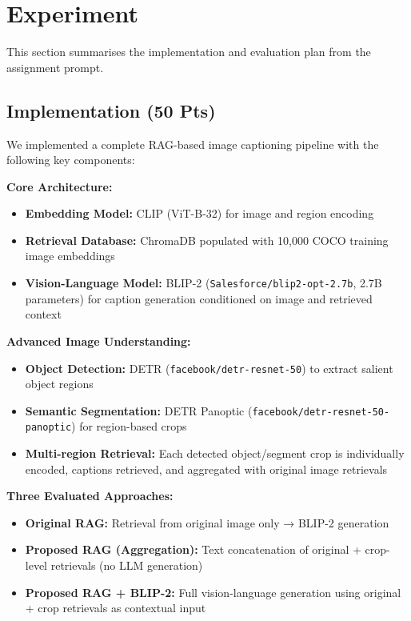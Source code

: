 \documentclass[11pt]{article}
\begin{document}
\section{Experiment}
\label{sec:experiment}

This section summarises the implementation and evaluation plan from the assignment prompt.

\subsection{Implementation (50 Pts)}
We implemented a complete RAG-based image captioning pipeline with the following key components:

\textbf{Core Architecture:}
\begin{itemize}
  \item \textbf{Embedding Model:} CLIP (ViT-B-32) for image and region encoding
  \item \textbf{Retrieval Database:} ChromaDB populated with 10,000 COCO training image embeddings
  \item \textbf{Vision-Language Model:} BLIP-2 (\texttt{Salesforce/blip2-opt-2.7b}, 2.7B parameters) for caption generation conditioned on image and retrieved context
\end{itemize}

\textbf{Advanced Image Understanding:}
\begin{itemize}
  \item \textbf{Object Detection:} DETR (\texttt{facebook/detr-resnet-50}) to extract salient object regions
  \item \textbf{Semantic Segmentation:} DETR Panoptic (\texttt{facebook/detr-resnet-50-panoptic}) for region-based crops
  \item \textbf{Multi-region Retrieval:} Each detected object/segment crop is individually encoded, captions retrieved, and aggregated with original image retrievals
\end{itemize}

\textbf{Three Evaluated Approaches:}
\begin{itemize}
  \item \textbf{Original RAG:} Retrieval from original image only → BLIP-2 generation
  \item \textbf{Proposed RAG (Aggregation):} Text concatenation of original + crop-level retrievals (no LLM generation)
  \item \textbf{Proposed RAG + BLIP-2:} Full vision-language generation using original + crop retrievals as contextual input
\end{itemize}
\end{document}
